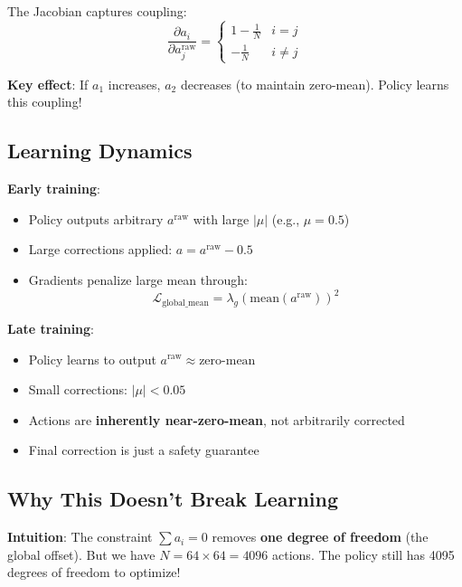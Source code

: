 \documentclass[11pt,a4paper]{article}
\theoremstyle{definition}
\begin{document}
The Jacobian captures coupling:
\begin{equation}
    \frac{\partial a_i}{\partial a_j^{\text{raw}}} = \begin{cases}
        1 - \frac{1}{N} & i = j \\
        -\frac{1}{N} & i \neq j
    \end{cases}
\end{equation}

\textbf{Key effect}: If $a_1$ increases, $a_2$ decreases (to maintain zero-mean). Policy learns this coupling!

\subsection{Learning Dynamics}

\textbf{Early training}:
\begin{itemize}
    \item Policy outputs arbitrary $a^{\text{raw}}$ with large $|\mu|$ (e.g., $\mu = 0.5$)
    \item Large corrections applied: $a = a^{\text{raw}} - 0.5$
    \item Gradients penalize large mean through:
    \begin{equation}
        \mathcal{L}_{\text{global\_mean}} = \lambda_g \left(\text{mean}(a^{\text{raw}})\right)^2
    \end{equation}
\end{itemize}

\textbf{Late training}:
\begin{itemize}
    \item Policy learns to output $a^{\text{raw}} \approx \text{zero-mean}$
    \item Small corrections: $|\mu| < 0.05$
    \item Actions are \textbf{inherently near-zero-mean}, not arbitrarily corrected
    \item Final correction is just a safety guarantee
\end{itemize}

\subsection{Why This Doesn't Break Learning}

\textbf{Intuition}: The constraint $\sum a_i = 0$ removes \textbf{one degree of freedom} (the global offset). But we have $N = 64 \times 64 = 4096$ actions. The policy still has 4095 degrees of freedom to optimize!
\end{document}
